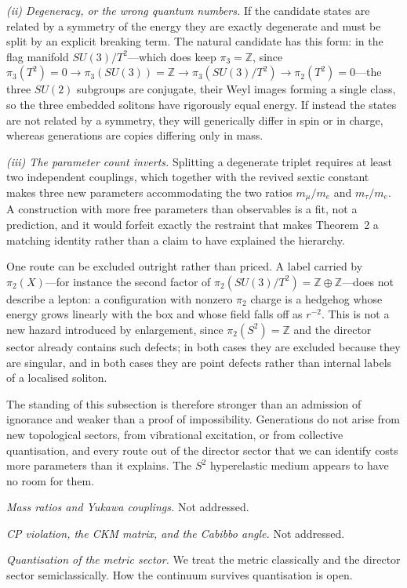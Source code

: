 \documentclass[aps,prd,preprint,nofootinbib,longbibliography]{revtex4-2}
\begin{document}
\emph{(ii) Degeneracy, or the wrong quantum numbers.} If the candidate states are
related by a symmetry of the energy they are exactly degenerate and must be split
by an explicit breaking term. The natural candidate has this form: in the flag
manifold $SU(3)/T^2$---which does keep $\pi_3=\mathbb{Z}$, since
$\pi_3(T^2)=0\to\pi_3(SU(3))=\mathbb{Z}\to\pi_3(SU(3)/T^2)\to\pi_2(T^2)=0$---the
three $SU(2)$ subgroups are conjugate, their Weyl images forming a single class,
so the three embedded solitons have rigorously equal energy. If instead the
states are not related by a symmetry, they will generically differ in spin or in
charge, whereas generations are copies differing only in mass.

\emph{(iii) The parameter count inverts.} Splitting a degenerate triplet requires
at least two independent couplings, which together with the revived sextic
constant makes three new parameters accommodating the two ratios $m_\mu/m_e$ and
$m_\tau/m_e$. A construction with more free parameters than observables is a fit,
not a prediction, and it would forfeit exactly the restraint that makes
Theorem~2 a matching identity rather than a claim to have explained the
hierarchy.

One route can be excluded outright rather than priced. A label carried by
$\pi_2(X)$---for instance the second factor of
$\pi_2(SU(3)/T^2)=\mathbb{Z}\oplus\mathbb{Z}$---does not describe a lepton: a
configuration with nonzero $\pi_2$ charge is a hedgehog whose energy grows
linearly with the box and whose field falls off as $r^{-2}$. This is not a new
hazard introduced by enlargement, since $\pi_2(S^2)=\mathbb{Z}$ and the director
sector already contains such defects; in both cases they are excluded because
they are singular, and in both cases they are point defects rather than internal
labels of a localised soliton.

The standing of this subsection is therefore stronger than an admission of
ignorance and weaker than a proof of impossibility. Generations do not arise
from new topological sectors, from vibrational excitation, or from collective
quantisation, and every route out of the director sector that we can identify
costs more parameters than it explains. The $S^2$ hyperelastic medium appears to
have no room for them.

\emph{Mass ratios and Yukawa couplings.} Not addressed.

\emph{CP violation, the CKM matrix, and the Cabibbo angle.} Not addressed.

\emph{Quantisation of the metric sector.} We treat the metric classically and the
director sector semiclassically. How the continuum survives quantisation is open.
\end{document}
